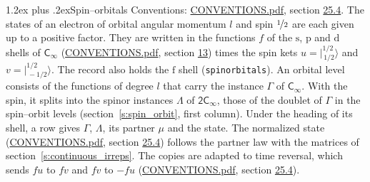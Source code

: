 \documentclass[10pt,a4paper]{article}
\makeatletter
\renewcommand\section{\@startsection{section}{1}{\z@}{-3ex plus -1ex minus -.2ex}%
  {1.2ex plus .2ex}{\normalfont\large\sffamily\bfseries\color{parttitle}}}
\numberwithin{equation}{section}
\newcommand{\grp}[1]{\mathsf{#1}}
\newcommand{\orbital}[1]{\mathrm{#1}}
\newcommand{\intx}{\mu}
\newcommand{\jm}[2]{\bigl\lvert{}^{#1}_{\,#2}\bigr\rangle}
\makeatother
\begin{document}
\section{Spin--orbitals}\label{s:spin_orbitals}
Conventions: \href{../../CONVENTIONS.pdf}{CONVENTIONS.pdf}, section \href{../../CONVENTIONS.pdf\#conv.25.4}{25.4}.
\leavevmode\label{n:index.orbital.l}The states of an electron of orbital angular momentum $l$ and spin $\nicefrac{1}{2}$ are each given up to a positive factor. \label{n:local.spinor.uv}\label{n:local.function.f}They are written in the functions $f$ of the $\orbital{s}$, $\orbital{p}$ and $\orbital{d}$ shells of \href{../../../rotation/data/pdf/Cinf.pdf}{$\grp{C_{\infty}}$} (\href{../../CONVENTIONS.pdf}{CONVENTIONS.pdf}, section \href{../../../rotation/CONVENTIONS.pdf\#conv.13}{13}) times the spin kets $u = \jm{1/2}{1/2}$ and $v = \jm{1/2}{-1/2}$. The record also holds the $\orbital{f}$ shell (\texttt{spinorbitals}). An orbital level consists of the functions of degree $l$ that carry the instance $\Gamma$ of \href{../../../rotation/data/pdf/Cinf.pdf}{$\grp{C_{\infty}}$}. With the spin, it splits into the spinor instances $\Lambda$ of $\grp{2C_{\infty }}$, those of the doublet of $\Gamma$ in the spin--orbit levels (section~\ref{s:spin_orbit}, first column). \label{n:head.state}Under the heading of its shell, a row gives $\Gamma$, $\Lambda$, its partner $\intx$ and the state. The normalized state (\href{../../CONVENTIONS.pdf}{CONVENTIONS.pdf}, section \href{../../CONVENTIONS.pdf\#conv.25.4}{25.4}) follows the partner law with the matrices of section~\ref{s:continuous_irreps}. The copies are adapted to time reversal, which sends $f u$ to $f v$ and $f v$ to $-f u$ (\href{../../CONVENTIONS.pdf}{CONVENTIONS.pdf}, section \href{../../CONVENTIONS.pdf\#conv.25.4}{25.4}).
\end{document}
